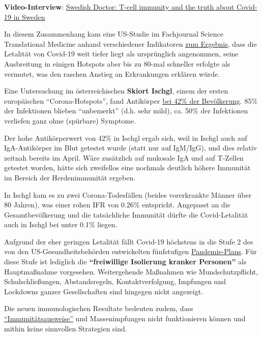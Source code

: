 \textbf{Video-Interview}:
\href{https://www.youtube.com/watch?v=CwQpg62Kflg}{Swedish Doctor:
T-cell immunity and the truth about Covid-19 in Sweden}

In diesem Zusammenhang kam eine US-Studie im Fachjournal Science
Translational Medicine anhand verschiedener Indikatoren
\href{https://news.psu.edu/story/623797/2020/06/22/research/initial-covid-19-infection-rate-may-be-80-times-greater-originally}{zum
Ergebnis}, dass die Letalität von Covid-19 weit tiefer liegt als
ursprünglich angenommen, seine Ausbreitung in einigen Hotspots aber bis
zu 80-mal schneller erfolgte als vermutet, was den raschen Anstieg an
Erkrankungen erklären würde.

Eine Untersuchung im österreichischen \textbf{Skiort Ischgl}, einem der
ersten europäischen ``Corona-Hotspots'', fand Antikörper
\href{https://www.derstandard.at/story/2000118306133/42-4-prozent-der-bewohner-ischgls-haben-antikoerper-gegen-sars}{bei
42\% der Bevölkerung}. 85\% der Infektionen blieben ``unbemerkt'' (d.h.
sehr mild), ca. 50\% der Infektionen verliefen ganz ohne (spürbare)
Symptome.

Der hohe Antikörperwert von 42\% in Ischgl ergab sich, weil in Ischgl
auch auf IgA-Antikörper im Blut getestet wurde (statt nur auf IgM/IgG),
und dies relativ zeitnah bereits im April. Wäre zusätzlich auf mukosale
IgA und auf T-Zellen getestet worden, hätte sich zweifellos eine
nochmals deutlich höhere Immunität im Bereich der Herdenimmunität
ergeben.

In Ischgl kam es zu zwei Corona-Todesfällen (beides vorerkrankte Männer
über 80 Jahren), was einer rohen IFR von 0.26\% entspricht. Angepasst an
die Gesamtbevölkerung und die tatsächliche Immunität dürfte die
Covid-Letalität auch in Ischgl bei unter 0.1\% liegen.

Aufgrund der eher geringen Letalität fällt Covid-19 höchstens in die
Stufe 2 des von den US-Gesundheitsbehörden entwickelten fünfstufigen
\href{https://www.cidrap.umn.edu/news-perspective/2007/02/hhs-ties-pandemic-mitigation-advice-severity}{Pandemie-Plans}.
Für diese Stufe ist lediglich die \textbf{``freiwillige Isolierung
kranker Personen''} als Hauptmaßnahme vorgesehen. Weitergehende
Maßnahmen wie Mundschutzpflicht, Schulschließungen, Abstandsregeln,
Kontaktverfolgung, Impfungen und Lockdowns ganzer Gesellschaften sind
hingegen nicht angezeigt.

Die neuen immunologischen Resultate bedeuten zudem, dass
\href{https://www.nature.com/articles/d41586-020-01451-0}{``Immunitätsausweise''}
und Massenimpfungen nicht funktionieren können und mithin keine
sinnvollen Strategien sind.

